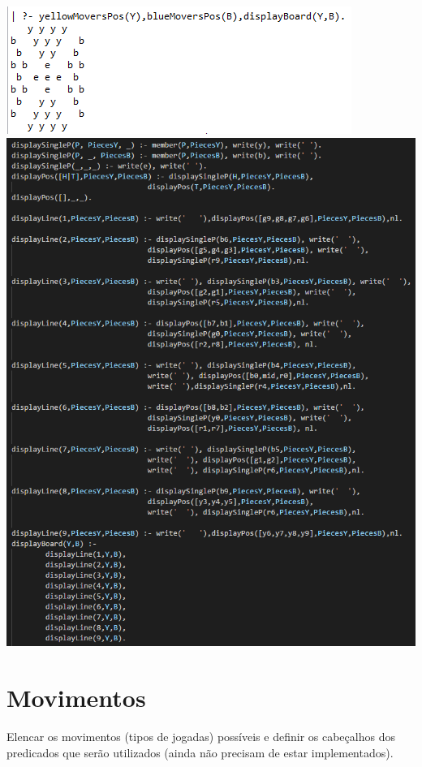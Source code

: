 \documentclass[a4paper]{article}
\begin{document}
\includegraphics[scale=1]{printBoard.PNG}\linebreak\linebreak
\includegraphics[scale=0.6]{displayBoard.PNG}\linebreak\linebreak




\section{Movimentos}

Elencar os movimentos (tipos de jogadas) possíveis e definir os cabeçalhos dos predicados que serão utilizados (ainda não precisam de estar implementados).
\end{document}
